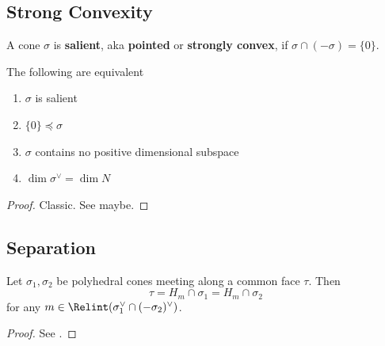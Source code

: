 \subsection{Strong Convexity}


\begin{definition}
  \label{1-2-12-salient-cone}
  \leanok

  A cone $\sigma$ is {\bf salient}, aka {\bf pointed} or {\bf strongly convex}, if $\sigma \cap (-\sigma) = \{0\}$.
\end{definition}


\begin{proposition}
  \label{1-2-12-salient-cone-tfae}

  The following are equivalent
  \begin{enumerate}
    \item $\sigma$ is salient
    \item $\{0\} \preceq \sigma$
    \item $\sigma$ contains no positive dimensional subspace
    \item $\dim \sigma^\vee = \dim N$
  \end{enumerate}
\end{proposition}
\begin{proof}

  Classic. See \cite{Oda_1988} maybe.
\end{proof}


\subsection{Separation}


\begin{lemma}
  \label{1-2-13-separation-lemma}

  Let $\sigma_1, \sigma_2$ be polyhedral cones meeting along a common face $\tau$. Then
  $$\tau = H_m \cap \sigma_1 = H_m \cap \sigma_2$$
  for any $m \in \Relint(\sigma_1^\vee \cap (-\sigma_2)^\vee)$.
\end{lemma}
\begin{proof}

  See \cite{Cox_2011}.
\end{proof}


